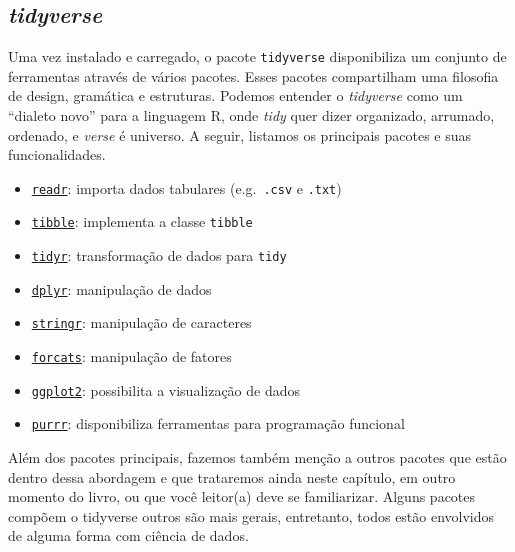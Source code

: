 \documentclass[
]{article}
\providecommand{\tightlist}{%
  \setlength{\itemsep}{0pt}\setlength{\parskip}{0pt}}
\begin{document}
\hypertarget{tidyverse}{%
\subsection{\texorpdfstring{\emph{tidyverse}}{tidyverse}}\label{tidyverse}}

Uma vez instalado e carregado, o pacote \texttt{tidyverse} disponibiliza um conjunto de ferramentas através de vários pacotes. Esses pacotes compartilham uma filosofia de design, gramática e estruturas. Podemos entender o \emph{tidyverse} como um ``dialeto novo'' para a linguagem R, onde \emph{tidy} quer dizer organizado, arrumado, ordenado, e \emph{verse} é universo. A seguir, listamos os principais pacotes e suas funcionalidades.

\begin{itemize}
\tightlist
\item
  \href{https://readr.tidyverse.org/}{\texttt{readr}}: importa dados tabulares (e.g.~\texttt{.csv} e \texttt{.txt})
\item
  \href{https://tibble.tidyverse.org/}{\texttt{tibble}}: implementa a classe \texttt{tibble}
\item
  \href{https://tidyr.tidyverse.org/}{\texttt{tidyr}}: transformação de dados para \texttt{tidy}
\item
  \href{https://dplyr.tidyverse.org/}{\texttt{dplyr}}: manipulação de dados
\item
  \href{https://github.com/tidyverse/stringr}{\texttt{stringr}}: manipulação de caracteres
\item
  \href{https://github.com/hadley/forcats}{\texttt{forcats}}: manipulação de fatores
\item
  \href{https://ggplot2.tidyverse.org/}{\texttt{ggplot2}}: possibilita a visualização de dados
\item
  \href{https://purrr.tidyverse.org/}{\texttt{purrr}}: disponibiliza ferramentas para programação funcional
\end{itemize}

Além dos pacotes principais, fazemos também menção a outros pacotes que estão dentro dessa abordagem e que trataremos ainda neste capítulo, em outro momento do livro, ou que você leitor(a) deve se familiarizar. Alguns pacotes compõem o tidyverse outros são mais gerais, entretanto, todos estão envolvidos de alguma forma com ciência de dados.
\end{document}
